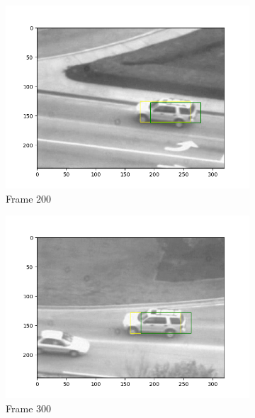 \documentclass{article} %
\begin{document}
\begin{figure}[H]
\begin{subfigure}[b]{0.30\textwidth}
        \end{subfigure}
        \begin{subfigure}[b]{0.30\textwidth}
            \centering
            \includegraphics[width=\textwidth]{q1,4_frame200.png}
            \caption{Frame 200}
        \end{subfigure}
        \begin{subfigure}[b]{0.30\textwidth}
            \centering
            \includegraphics[width=\textwidth]{q1,4_frame300.png}
            \caption{Frame 300}
        \end{subfigure}
        \begin{subfigure}[b]{0.30\textwidth}
            \centering

\end{subfigure}
\end{figure}
\end{document}
